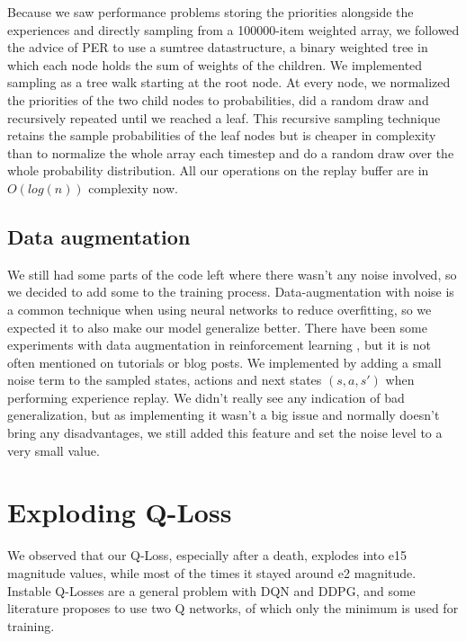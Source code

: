 \documentclass[hyperref,german,beleg]{cgvpub}
\begin{document}
Because we saw performance problems storing the priorities alongside the experiences and directly sampling from a 100000-item weighted array, we followed the advice of \ac{PER} to use a sumtree datastructure, a binary weighted tree in which each node holds the sum of weights of the children. We implemented sampling as a tree walk starting at the root node. At every node, we normalized the priorities of the two child nodes to probabilities, did a random draw and recursively repeated until we reached a leaf. This recursive sampling technique retains the sample probabilities of the leaf nodes but is cheaper in complexity than to normalize the whole array each timestep and do a random draw over the whole probability distribution. All our operations on the replay buffer are in $O(log(n))$ complexity now.

\subsection{Data augmentation}

We still had some parts of the code left where there wasn't any noise involved, so we decided to add some to the training process. Data-augmentation with noise is a common technique when using neural networks \cite[p.347]{bishopNeuralNetworksPattern1995} to reduce overfitting, so we expected it to also make our model generalize better. There have been some experiments with data augmentation in reinforcement learning \cite{cobbeQuantifyingGeneralizationReinforcement2019}, but it is not often mentioned on tutorials or blog posts. We implemented by adding a small noise term to the sampled states, actions and next states \((s, a, s')\) when performing experience replay. We didn't really see any indication of bad generalization, but as implementing it wasn't a big issue and normally doesn't bring any disadvantages, we still added this feature and set the noise level to a very small value.

\section{Exploding Q-Loss}

We observed that our Q-Loss, especially after a death, explodes into e15 magnitude values, while most of the times it stayed around e2 magnitude. Instable Q-Losses are a general problem with DQN and DDPG, and some literature \cite{fujimotoAddressingFunctionApproximation2018} proposes to use two Q networks, of which only the minimum is used for training. 
\end{document}
